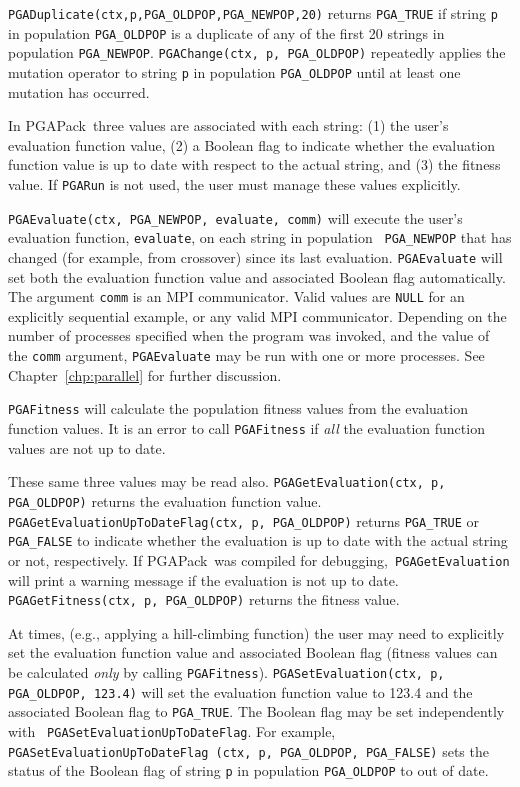 \documentclass{report}
\newcommand{\pga}{PGAPack}
\begin{document}
\begin{sloppypar}
{\tt PGADuplicate(ctx,p,PGA\_OLDPOP,PGA\_NEWPOP,20)} returns {\tt PGA\_TRUE}
if string {\tt p} in population {\tt PGA\_OLDPOP} is a duplicate of any of the
first 20 strings in population {\tt PGA\_NEWPOP}.  {\tt PGAChange(ctx, p,
PGA\_OLDPOP)} repeatedly applies the mutation operator to string {\tt p} in
population {\tt PGA\_OLDPOP} until at least one mutation has occurred.
\end{sloppypar}

In \pga\ three  values are associated with each string: (1) the user's
evaluation function value, (2) a Boolean flag to indicate whether the
evaluation function value is up to date with respect to the actual string, and
(3) the fitness value.  If {\tt PGARun} is not used, the user must manage
these values explicitly.

\begin{sloppypar}
{\tt PGAEvaluate(ctx, PGA\_NEWPOP, evaluate, comm)} will execute the user's
evaluation function, {\tt evaluate}, on each string in population {\tt
PGA\_NEWPOP} that has changed (for example, from crossover) since its last
evaluation.  {\tt PGAEvaluate} will set both the evaluation function value and
associated Boolean flag automatically.  The argument {\tt comm} is an MPI
communicator.  Valid values are {\tt NULL} for an explicitly sequential
example, or any valid MPI communicator.  Depending on the number of processes
specified when the program was invoked, and the value of the {\tt comm}
argument, {\tt PGAEvaluate} may be run with one or more processes.  See
Chapter~\ref{chp:parallel} for further discussion.
\end{sloppypar}

{\tt PGAFitness} will calculate the population fitness values from the
evaluation function values.  It is an error to call {\tt PGAFitness} if {\em
all} the evaluation function values are not up to date.

These same three values may be read also.  {\tt PGAGetEvaluation(ctx, p,
PGA\_OLDPOP)} returns the evaluation function value. {\tt
PGAGetEvaluationUpToDateFlag(ctx, p, PGA\_OLDPOP)} returns {\tt PGA\_TRUE} or
{\tt PGA\_FALSE} to indicate whether the evaluation is up to date with the
actual string or not, respectively.  If \pga\ was compiled for debugging,{\tt
PGAGetEvaluation} will print a warning message if the evaluation is not up to
date.  {\tt PGAGetFitness(ctx, p, PGA\_OLDPOP)} returns the fitness value.

\begin{sloppypar}
At times, (e.g., applying a hill-climbing function) the user may need to
explicitly set the evaluation function value and associated Boolean flag
(fitness values can be calculated {\em only} by calling {\tt PGAFitness}).
{\tt PGASetEvaluation(ctx, p, PGA\_OLDPOP, 123.4)} will set the evaluation
function value to 123.4 and the associated Boolean flag to {\tt PGA\_TRUE}.
The Boolean flag may be set independently with {\tt
PGASetEvaluationUpToDateFlag}.  For example, {\tt PGASetEvaluationUpToDateFlag
(ctx, p, PGA\_OLDPOP, PGA\_FALSE)} sets the status of the Boolean flag of
string {\tt p} in population {\tt PGA\_OLDPOP} to out of date.
\end{sloppypar}
\end{document}
